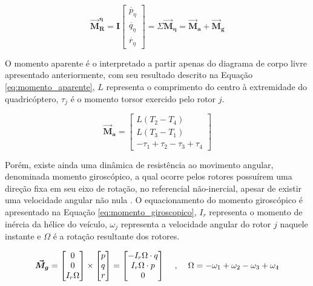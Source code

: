 \documentclass[main.tex]{subfiles}
\begin{document}
\begin{equation}\label{eq:dinamica_rotacao_nao_inercial_incompleta}
	\boldsymbol{\vec{M}^\eta_R} = \boldsymbol{I} \begin{bmatrix}
		\dot{p_\eta}\\
		\dot{q_\eta}\\
		\dot{r_\eta}
	\end{bmatrix} = \Sigma \boldsymbol{\vec{M}_\eta} = \boldsymbol{\vec{M}_a} + \boldsymbol{\vec{M}_g}
\end{equation}

O momento aparente é o interpretado a partir apenas do diagrama de corpo livre apresentado anteriormente, com seu resultado descrito na Equação \ref{eq:momento_aparente}, $L$ representa o comprimento do centro à extremidade do quadricóptero, $\tau_j$ é o momento torsor exercido pelo rotor $j$.

\begin{equation}\label{eq:momento_aparente}
	\boldsymbol{\vec{M}_a} =
	\begin{bmatrix}
		L (T_2 - T_4)\\
		L (T_3 - T_1)\\
		-\tau_1 + \tau_2 - \tau_3 + \tau_4
	\end{bmatrix}
\end{equation}

Porém, existe ainda uma dinâmica de resistência ao movimento angular, denominada momento giroscópico, a qual ocorre pelos rotores possuírem uma direção fixa em seu eixo de rotação, no referencial não-inercial, apesar de existir uma velocidade angular não nula \cite{hibbeler2011engineering}. O equacionamento do momento giroscópico é apresentado na Equação \ref{eq:momento_giroscopico}, $I_r$ representa o momento de inércia da hélice do veículo, $\omega_j$ representa a velocidade angular do rotor $j$ naquele instante e $\Omega$ é a rotação resultante dos rotores.

\begin{equation}\label{eq:momento_giroscopico}
	\boldsymbol{\vec{M}_g} = \begin{bmatrix}
		0\\
		0\\
		I_r\Omega
	\end{bmatrix} \times \begin{bmatrix}
		p\\
		q\\
		r
	\end{bmatrix} = \begin{bmatrix}
		- I_r\Omega\cdot q\\
		I_r\Omega\cdot p\\
		0
	\end{bmatrix} \hspace{0.4cm} , \hspace{0.4cm} \Omega = -\omega_1 + \omega_2 - \omega_3 + \omega_4
\end{equation}
\end{document}
